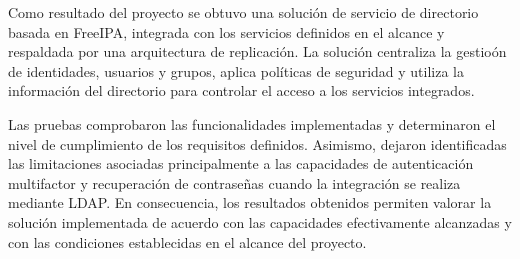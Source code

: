 Como resultado del proyecto se obtuvo una solución de servicio de directorio basada en FreeIPA, integrada con los servicios definidos en el alcance y respaldada por una arquitectura de replicación. La solución centraliza la gestioón de identidades, usuarios y grupos, aplica políticas de seguridad y utiliza la información del directorio para controlar el acceso a los servicios integrados.

Las pruebas comprobaron las funcionalidades implementadas y determinaron el nivel de cumplimiento de los requisitos definidos. Asimismo, dejaron identificadas las limitaciones asociadas principalmente a las capacidades de autenticación multifactor y recuperación de contraseñas cuando la integración se realiza mediante LDAP. En consecuencia, los resultados obtenidos permiten valorar la solución implementada de acuerdo con las capacidades efectivamente alcanzadas y con las condiciones establecidas en el alcance del proyecto.
